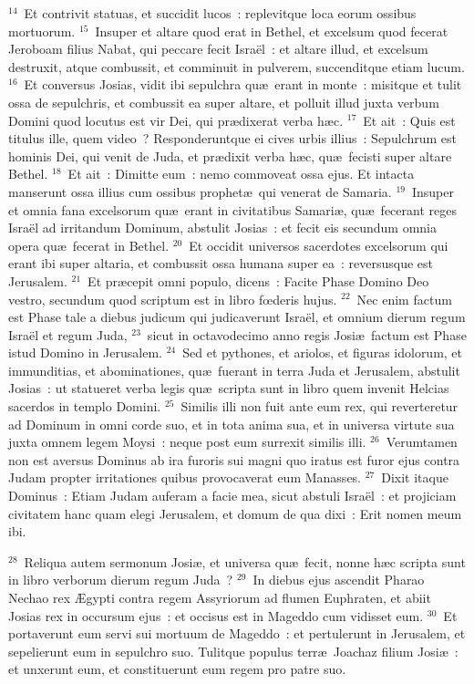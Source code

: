 ${}^{14}$~Et contrivit statuas, et succidit lucos~: replevitque loca eorum ossibus mortuorum.
${}^{15}$~Insuper et altare quod erat in Bethel, et excelsum quod fecerat Jeroboam filius Nabat, qui peccare fecit Isra\"el~: et altare illud, et excelsum destruxit, atque combussit, et comminuit in pulverem, succenditque etiam lucum.
${}^{16}$~Et conversus Josias, vidit ibi sepulchra qu\ae\ erant in monte~: misitque et tulit ossa de sepulchris, et combussit ea super altare, et polluit illud juxta verbum Domini quod locutus est vir Dei, qui pr\ae dixerat verba h\ae c.
${}^{17}$~Et ait~: Quis est titulus ille, quem video~? Responderuntque ei cives urbis illius~: Sepulchrum est hominis Dei, qui venit de Juda, et pr\ae dixit verba h\ae c, qu\ae\ fecisti super altare Bethel.
${}^{18}$~Et ait~: Dimitte eum~: nemo commoveat ossa ejus. Et intacta manserunt ossa illius cum ossibus prophet\ae\ qui venerat de Samaria.
${}^{19}$~Insuper et omnia fana excelsorum qu\ae\ erant in civitatibus Samari\ae , qu\ae\ fecerant reges Isra\"el ad irritandum Dominum, abstulit Josias~: et fecit eis secundum omnia opera qu\ae\ fecerat in Bethel.
${}^{20}$~Et occidit universos sacerdotes excelsorum qui erant ibi super altaria, et combussit ossa humana super ea~: reversusque est Jerusalem.
${}^{21}$~Et pr\ae cepit omni populo, dicens~: Facite Phase Domino Deo vestro, secundum quod scriptum est in libro fœderis hujus.
${}^{22}$~Nec enim factum est Phase tale a diebus judicum qui judicaverunt Isra\"el, et omnium dierum regum Isra\"el et regum Juda,
${}^{23}$~sicut in octavodecimo anno regis Josi\ae\ factum est Phase istud Domino in Jerusalem.
${}^{24}$~Sed et pythones, et ariolos, et figuras idolorum, et immunditias, et abominationes, qu\ae\ fuerant in terra Juda et Jerusalem, abstulit Josias~: ut statueret verba legis qu\ae\ scripta sunt in libro quem invenit Helcias sacerdos in templo Domini.
${}^{25}$~Similis illi non fuit ante eum rex, qui reverteretur ad Dominum in omni corde suo, et in tota anima sua, et in universa virtute sua juxta omnem legem Moysi~: neque post eum surrexit similis illi.
${}^{26}$~Verumtamen non est aversus Dominus ab ira furoris sui magni quo iratus est furor ejus contra Judam propter irritationes quibus provocaverat eum Manasses.
${}^{27}$~Dixit itaque Dominus~: Etiam Judam auferam a facie mea, sicut abstuli Isra\"el~: et projiciam civitatem hanc quam elegi Jerusalem, et domum de qua dixi~: Erit nomen meum ibi.


${}^{28}$~Reliqua autem sermonum Josi\ae , et universa qu\ae\ fecit, nonne h\ae c scripta sunt in libro verborum dierum regum Juda~?
${}^{29}$~In diebus ejus ascendit Pharao Nechao rex \AE gypti contra regem Assyriorum ad flumen Euphraten, et abiit Josias rex in occursum ejus~: et occisus est in Mageddo cum vidisset eum.
${}^{30}$~Et portaverunt eum servi sui mortuum de Mageddo~: et pertulerunt in Jerusalem, et sepelierunt eum in sepulchro suo. Tulitque populus terr\ae\ Joachaz filium Josi\ae~: et unxerunt eum, et constituerunt eum regem pro patre suo.


